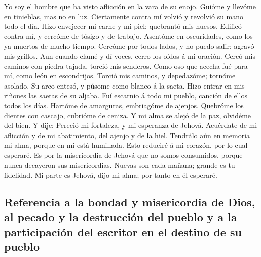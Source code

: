  Yo soy el hombre que ha visto aflicción en la vara de su
enojo.  Guióme y llevóme en tinieblas, mas no en luz.
 Ciertamente contra mí volvió y revolvió su mano todo el
día.  Hizo envejecer mi carne y mi piel; quebrantó mis
huesos.  Edificó contra mí, y cercóme de tósigo y de
trabajo.  Asentóme en oscuridades, como los ya muertos de
mucho tiempo.  Cercóme por todos lados, y no puedo salir;
agravó mis grillos.  Aun cuando clamé y dí voces, cerro los
oídos á mi oración.  Cercó mis caminos con piedra tajada,
torció mis senderos.  Como oso que acecha fué para mí, como
león en escondrijos.  Torció mis caminos, y depedazóme;
tornóme asolado.  Su arco entesó, y púsome como blanco á la
saeta.  Hizo entrar en mis riñones las saetas de su aljaba.
 Fuí escarnio á todo mi pueblo, canción de ellos todos los
días.  Hartóme de amarguras, embriagóme de ajenjos.
 Quebróme los dientes con cascajo, cubrióme de ceniza.
 Y mi alma se alejó de la paz, olvidéme del bien.
 Y dije: Pereció mi fortaleza, y mi esperanza de Jehová.
 Acuérdate de mi aflicción y de mi abatimiento, del ajenjo
y de la hiel.  Tendrálo aún en memoria mi alma, porque en
mí está humillada.  Esto reduciré á mi corazón, por lo cual
esperaré.  Es por la misericordia de Jehová que no somos
consumidos, porque nunca decayeron sus misericordias. 
Nuevas son cada mañana; grande es tu fidelidad.  Mi parte
es Jehová, dijo mi alma; por tanto en él esperaré.

\hypertarget{referencia-a-la-bondad-y-misericordia-de-dios-al-pecado-y-la-destrucciuxf3n-del-pueblo-y-a-la-participaciuxf3n-del-escritor-en-el-destino-de-su-pueblo}{%
\subsection{Referencia a la bondad y misericordia de Dios, al pecado y
la destrucción del pueblo y a la participación del escritor en el
destino de su
pueblo}\label{referencia-a-la-bondad-y-misericordia-de-dios-al-pecado-y-la-destrucciuxf3n-del-pueblo-y-a-la-participaciuxf3n-del-escritor-en-el-destino-de-su-pueblo}}

